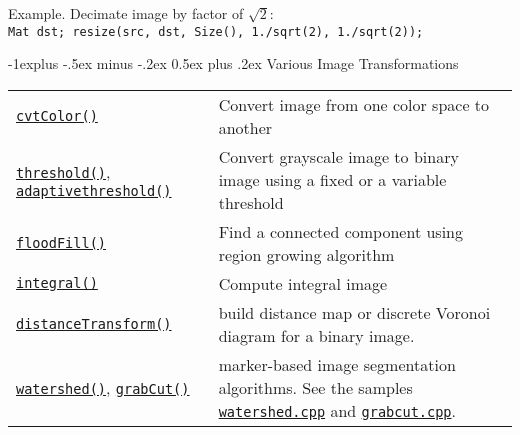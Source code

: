 \documentclass[10pt,landscape]{article}
\makeatletter
\renewcommand{\subsection}{\@startsection{subsection}{2}{0mm}%
                                {-1explus -.5ex minus -.2ex}%
                                {0.5ex plus .2ex}%
                                {\normalfont\normalsize\bfseries}}
\makeatother
\begin{document}
\begin{multicols}{3}
\begin{tabular}{@{}p{\the\MyLen}%
                @{}p{\linewidth-\the\MyLen}@{}}
\end{tabular}

\begin{tabbing}
Example. Decimate image by factor of $\sqrt{2}$:\\
\texttt{Mat dst; resize(src, dst, Size(), 1./sqrt(2), 1./sqrt(2));}
\end{tabbing}

\subsection{Various Image Transformations}

\begin{tabular}{@{}p{\the\MyLen}%
                @{}p{\linewidth-\the\MyLen}@{}}

\texttt{\href{http://opencv.willowgarage.com/documentation/cpp/miscellaneous_image_transformations.html\#cvtColor}{cvtColor()}} & Convert image from one color space to another \\

\texttt{\href{http://opencv.willowgarage.com/documentation/cpp/miscellaneous_image_transformations.html\#threshold}{threshold()}}, \texttt{\href{http://opencv.willowgarage.com/documentation/cpp/miscellaneous_image_transformations.html\#adaptivethreshold}{adaptivethreshold()}} & Convert grayscale image to binary image using a fixed or a variable threshold \\

\texttt{\href{http://opencv.willowgarage.com/documentation/cpp/miscellaneous_image_transformations.html\#floodfill}{floodFill()}} & Find a connected component using region growing algorithm\\

\texttt{\href{http://opencv.willowgarage.com/documentation/cpp/miscellaneous_image_transformations.html\#floodfill}{integral()}} & Compute integral image \\

\texttt{\href{http://opencv.willowgarage.com/documentation/cpp/miscellaneous_image_transformations.html\#distancetransform}{distanceTransform()}}
 & build distance map or discrete Voronoi diagram for a binary image. \\

\texttt{\href{http://opencv.willowgarage.com/documentation/cpp/miscellaneous_image_transformations.html\#floodfill}{watershed()}},
\texttt{\href{http://opencv.willowgarage.com/documentation/cpp/miscellaneous_image_transformations.html\#grabcut}{grabCut()}}
 & marker-based image segmentation algorithms.
 See the samples \texttt{\href{https://code.ros.org/svn/opencv/trunk/opencv/samples/c/watershed.cpp}{watershed.cpp}} and \texttt{\href{https://code.ros.org/svn/opencv/trunk/opencv/samples/c/grabcut.c}{grabcut.cpp}}.


\end{tabular}
\end{multicols}
\end{document}
